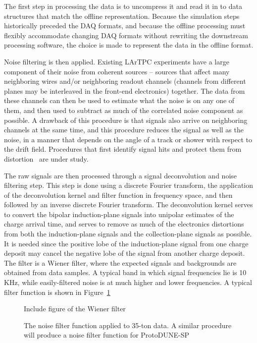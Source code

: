 The first step in processing the data is to uncompress it and read it
in to data structures that match the offline representation.  Because
the simulation steps historically preceded the DAQ formats, and
because the offline processing must flexibly accommodate changing DAQ
formats without rewriting the downstream processing software, the
choice is made to represent the data in the offline format.


Noise filtering is then applied.  Existing LArTPC experiments have a
large component of their noise from coherent sources -- sources that
affect many neighboring wires and/or neighboring readout channels
(channels from different planes may be interleaved in the front-end
electronics) together.  The data from these channels can then be used
to estimate what the noise is on any one of them, and then used to
subtract as much of the correlated noise component as possible.  A
drawback of this procedure is that signals also arrive on neighboring
channels at the same time, and this procedure reduces the signal as
well as the noise, in a manner that depends on the angle of a track or
shower with respect to the drift field.  Procedures that first
identify signal hits and protect them from
distortion~\cite{microboone_noise} are under study.

The raw signals are then processed through a signal deconvolution and
noise filtering step.  This step is done using a discrete Fourier
transform, the application of the deconvolution kernel and filter
function in frequency space, and then followed by an inverse discrete
Fourier transform.  The deconvolution kernel serves to convert the
bipolar induction-plane signals into unipolar estimates of the charge
arrival time, and serves to remove as much of the electronics
distortions from both the induction-plane signals and the
collection-plane signals as possible.  It is needed since the positive
lobe of the induction-plane signal from one charge deposit may cancel
the negative lobe of the signal from another charge deposit.  The
filter is a Wiener filter, where the expected signals and backgrounds
are obtained from data samples.  A typical band in which signal
frequencies lie is 10 KHz, while easily-filtered noise is at much
higher and lower frequencies.  A typical filter function is shown in
Figure~\ref{fig:wienerfilter}

\begin{figure}[htb]
\centering
Include figure of the Wiener filter
\caption{The noise filter function applied to 35-ton data.  A similar
  procedure will produce a noise filter function for ProtoDUNE-SP}
\label{fig:wienerfilter}
\end{figure}

